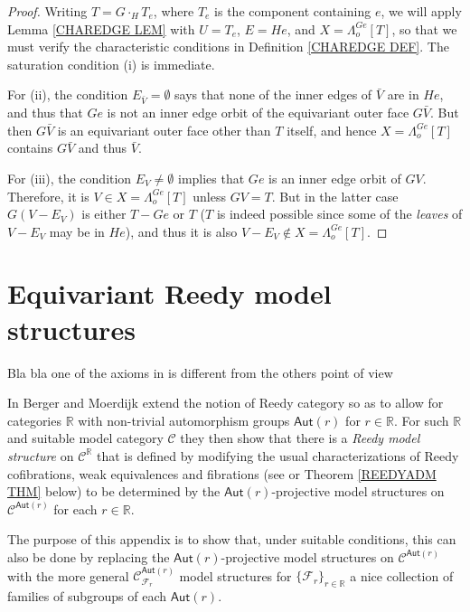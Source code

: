 \documentclass[a4paper,10pt,draft]{article}%
\numberwithin{equation}{section}%
\numberwithin{figure}{section}
\begin{document}
\begin{proof}
	Writing $T = G \cdot_H T_e$, where $T_e$ is the component containing $e$,
	we will apply Lemma \ref{CHAREDGE LEM}
	with $U=T_e$, $E=He$, and $X=\Lambda_o^{Ge}[T]$,
	so that we must verify the characteristic conditions in Definition \ref{CHAREDGE DEF}.
	The saturation condition (i) is immediate.
	
	For (ii), the condition $E_{\bar{V}} = \emptyset$
	says that none of the inner edges of $\bar{V}$ are in $He$,
	and thus that $Ge$ is not an inner edge orbit of the equivariant outer face $G\bar{V}$. But then $G\bar{V}$ is an equivariant outer face other than $T$ itself,
	and hence $X=\Lambda_o^{Ge}[T]$ contains $G\bar{V}$ and thus $\bar{V}$.
	
	For (iii), the condition $E_{V} \neq \emptyset$ implies that 
	$Ge$ is an inner edge orbit of $GV$. Therefore, it is 
	$V \in X=\Lambda_o^{Ge}[T]$
	unless $GV=T$.
	But in the latter case 
	$G(V - E_V)$ is either $T-Ge$ or $T$ ($T$ is indeed possible since some of the \textit{leaves} of $V-E_V$ may be in $He$), and thus it is also 
	$V-E_V \not \in X=\Lambda_o^{Ge}[T]$.
\end{proof}





\newpage

\appendix

\section{Equivariant Reedy model structures}


{\color{blue} Bla bla one of the axioms in \cite{BM11} is different from the others point of view}

In \cite{BM11} Berger and Moerdijk extend the notion of Reedy category so as to allow for categories $\mathbb{R}$
 with non-trivial automorphism groups 
 $\mathsf{Aut}(r)$ for $r \in \mathbb{R}$.
For such $\mathbb{R}$ and suitable model category $\mathcal{C}$ they then show that there is a 
\textit{Reedy model structure}
on $\mathcal{C}^{\mathbb{R}}$
that is defined by modifying the usual characterizations of
Reedy cofibrations, weak equivalences and fibrations
(see \cite[Thm. 1.6]{BM11} or
Theorem \ref{REEDYADM THM} below)
 to be determined by the $\mathsf{Aut}(r)$-projective model structures
on $\mathcal{C}^{\mathsf{Aut}(r)}$
for each $r \in \mathbb{R}$. 

The purpose of this appendix is to show that,
under suitable conditions, this can also be done by replacing
the $\mathsf{Aut}(r)$-projective model structures
on $\mathcal{C}^{\mathsf{Aut}(r)}$
with the more general 
$\mathcal{C}^{\mathsf{Aut}(r)}_{\mathcal{F}_r}$
model structures for 
$\{\mathcal{F}_r\}_{r \in \mathbb{R}}$
a nice collection of families of subgroups of each 
$\mathsf{Aut}(r)$.
\end{document}
